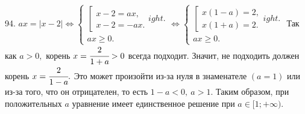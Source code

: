 94. $ax=|x-2|\Leftrightarrow \begin{cases}\left[\begin{array}{l}x-2=ax,\\ x-2=-ax.\end{array}
ight.\\ ax\geqslant0.\end{cases}\Leftrightarrow
\begin{cases}\left[\begin{array}{l}x(1-a)=2,\\ x(1+a)=2.\end{array}
ight.\\ ax\geqslant0.\end{cases}$
Так как $a>0,$ корень $x=\cfrac{2}{1+a}>0$ всегда подходит. Значит, не подходить должен корень $x=\cfrac{2}{1-a}.$ Это может произойти из-за нуля в знаменателе $(a=1)$ или из-за того, что он отрицателен, то есть $1-a<0,\ a>1.$ Таким образом, при положительных $a$ уравнение имеет единственное решение при $a\in[1;+\infty).$\\
